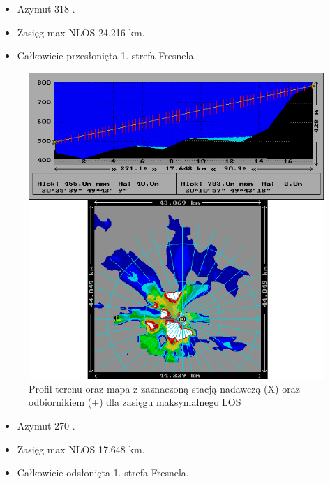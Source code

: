 \documentclass[12pt, a4paper, oneside]{article}
\begin{document}
\begin{itemize}
\item Azymut 318 \textdegree.
\item Zasięg max NLOS 24.216 km.
\item Całkowicie przesłonięta 1. strefa Fresnela.
\end{itemize}
\clearpage
\begin{figure}[h!]
\centering
\includegraphics[scale=1]{pics/f3.png}
\caption{Profil terenu oraz mapa z zaznaczoną stacją nadawczą (X) oraz odbiornikiem (+) dla zasięgu maksymalnego LOS}
\end{figure}
\begin{itemize}
\item Azymut 270 \textdegree.
\item Zasięg max NLOS 17.648 km.
\item Całkowicie odsłonięta 1. strefa Fresnela.
\end{itemize}
\clearpage
\end{document}
